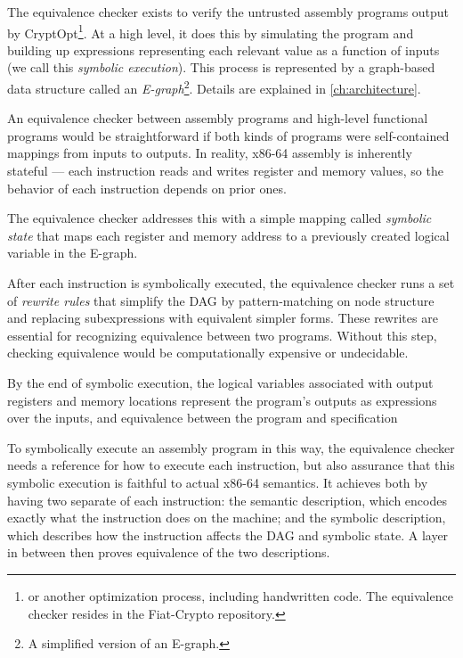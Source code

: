 The equivalence checker exists to verify the untrusted assembly programs output by CryptOpt\footnote{or another optimization process, including handwritten code. The equivalence checker resides in the Fiat-Crypto repository.}. At a high level, it does this by simulating the program and building up expressions representing each relevant value as a function of inputs (we call this \emph{symbolic execution}). This process is represented by a graph-based data structure called an \emph{E-graph}\footnote{A simplified version of an E-graph.}. Details are explained in \autoref{ch:architecture}.

An equivalence checker between assembly programs and high-level functional programs would be straightforward if both kinds of programs were self-contained mappings from inputs to outputs. In reality, x86-64 assembly is inherently stateful --- each instruction reads and writes register and memory values, so the behavior of each instruction depends on prior ones.

The equivalence checker addresses this with a simple mapping called \emph{symbolic state} that maps each register and memory address to a previously created logical variable in the E-graph. 

After each instruction is symbolically executed, the equivalence checker runs a set of \emph{rewrite rules} that simplify the DAG by pattern-matching on node structure and replacing subexpressions with equivalent simpler forms.
These rewrites are essential for recognizing equivalence between two programs. Without this step, checking equivalence would be computationally expensive or undecidable.

By the end of symbolic execution, the logical variables associated with output registers and memory locations represent the program's outputs as expressions over the inputs, and equivalence between the program and specification 

To symbolically execute an assembly program in this way, the equivalence checker needs a reference for how to execute each instruction, but also assurance that this symbolic execution is faithful to actual x86-64 semantics.
It achieves both by having two separate  of each instruction: the semantic description, which encodes exactly what the instruction does on the machine; and the symbolic description, which describes how the instruction affects the DAG and symbolic state.
A layer in between then proves equivalence of the two descriptions.

